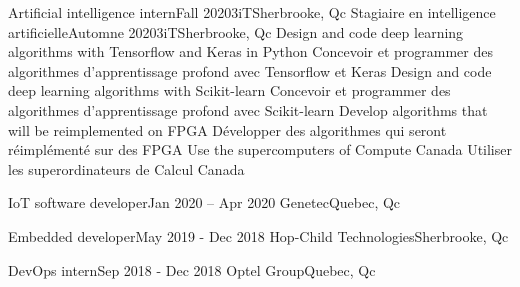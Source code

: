\documentclass[letterpaper,11pt]{resume}
\begin{document}
    \resumeSubheadingEnFr
        {Artificial intelligence intern}{Fall 2020}{3iT}{Sherbrooke, Qc}
        {Stagiaire en intelligence artificielle}{Automne 2020}{3iT}{Sherbrooke, Qc}
        \resumeItemListStart
            \resumeItemEnFr
                {Design and code deep learning algorithms with Tensorflow and Keras in Python}
                {Concevoir et programmer des algorithmes d'apprentissage profond avec Tensorflow et Keras}
            \resumeItemEnFr
                {Design and code deep learning algorithms with Scikit-learn}
                {Concevoir et programmer des algorithmes d'apprentissage profond avec Scikit-learn}
            \resumeItemEnFr
                {Develop algorithms that will be reimplemented on FPGA}
                {Développer des algorithmes qui seront réimplémenté sur des FPGA}
            \resumeItemEnFr
                {Use the supercomputers of Compute Canada}
                {Utiliser les superordinateurs de Calcul Canada}
        \resumeItemListEnd
      
    \resumeSubheading
      {IoT software developer}{Jan 2020 -- Apr 2020}
      {Genetec}{Quebec, Qc}
      \resumeItemListStart
      \resumeItemListEnd


    \resumeSubheading
      {Embedded developer}{May 2019 - Dec 2018}
      {Hop-Child Technologies}{Sherbrooke, Qc}
      \resumeItemListStart
    \resumeItemListEnd

    \resumeSubheading
      {DevOps intern}{Sep 2018 - Dec 2018}
      {Optel Group}{Quebec, Qc}
      \resumeItemListStart
      \resumeItemListEnd
\end{document}

